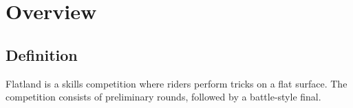 \chapter{Overview}

\section{Definition}

Flatland is a skills competition where riders perform tricks on a flat surface. 
The competition consists of preliminary rounds, followed by a battle-style final. 
